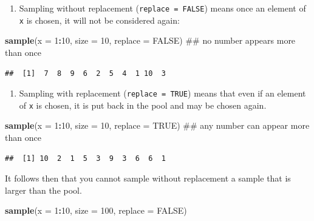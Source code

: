 \documentclass[]{book}
\newenvironment{Shaded}{\begin{snugshade}}{\end{snugshade}}
\newcommand{\KeywordTok}[1]{\textcolor[rgb]{0.13,0.29,0.53}{\textbf{#1}}}
\newcommand{\DataTypeTok}[1]{\textcolor[rgb]{0.13,0.29,0.53}{#1}}
\newcommand{\DecValTok}[1]{\textcolor[rgb]{0.00,0.00,0.81}{#1}}
\newcommand{\OtherTok}[1]{\textcolor[rgb]{0.56,0.35,0.01}{#1}}
\newcommand{\OperatorTok}[1]{\textcolor[rgb]{0.81,0.36,0.00}{\textbf{#1}}}
\newcommand{\NormalTok}[1]{#1}
\providecommand{\tightlist}{%
  \setlength{\itemsep}{0pt}\setlength{\parskip}{0pt}}
\theoremstyle{definition}
\theoremstyle{definition}
\theoremstyle{definition}
\theoremstyle{remark}
\begin{document}
\begin{enumerate}
\def\labelenumi{\arabic{enumi}.}
\tightlist
\item
  Sampling without replacement (\texttt{replace\ =\ FALSE}) means once
  an element of \texttt{x} is chosen, it will not be considered again:
\end{enumerate}

\begin{Shaded}
\begin{Highlighting}[]
\KeywordTok{sample}\NormalTok{(}\DataTypeTok{x =} \DecValTok{1}\OperatorTok{:}\DecValTok{10}\NormalTok{, }\DataTypeTok{size =} \DecValTok{10}\NormalTok{, }\DataTypeTok{replace =} \OtherTok{FALSE}\NormalTok{) ## no number appears more than once}
\end{Highlighting}
\end{Shaded}

\begin{verbatim}
##  [1]  7  8  9  6  2  5  4  1 10  3
\end{verbatim}

\begin{enumerate}
\def\labelenumi{\arabic{enumi}.}
\setcounter{enumi}{1}
\tightlist
\item
  Sampling with replacement (\texttt{replace\ =\ TRUE}) means that even
  if an element of \texttt{x} is chosen, it is put back in the pool and
  may be chosen again.
\end{enumerate}

\begin{Shaded}
\begin{Highlighting}[]
\KeywordTok{sample}\NormalTok{(}\DataTypeTok{x =} \DecValTok{1}\OperatorTok{:}\DecValTok{10}\NormalTok{, }\DataTypeTok{size =} \DecValTok{10}\NormalTok{, }\DataTypeTok{replace =} \OtherTok{TRUE}\NormalTok{) ## any number can appear more than once}
\end{Highlighting}
\end{Shaded}

\begin{verbatim}
##  [1] 10  2  1  5  3  9  3  6  6  1
\end{verbatim}

It follows then that you cannot sample without replacement a sample that
is larger than the pool.

\begin{Shaded}
\begin{Highlighting}[]
\KeywordTok{sample}\NormalTok{(}\DataTypeTok{x =} \DecValTok{1}\OperatorTok{:}\DecValTok{10}\NormalTok{, }\DataTypeTok{size =} \DecValTok{100}\NormalTok{, }\DataTypeTok{replace =} \OtherTok{FALSE}\NormalTok{)}
\end{Highlighting}
\end{Shaded}
\end{document}
